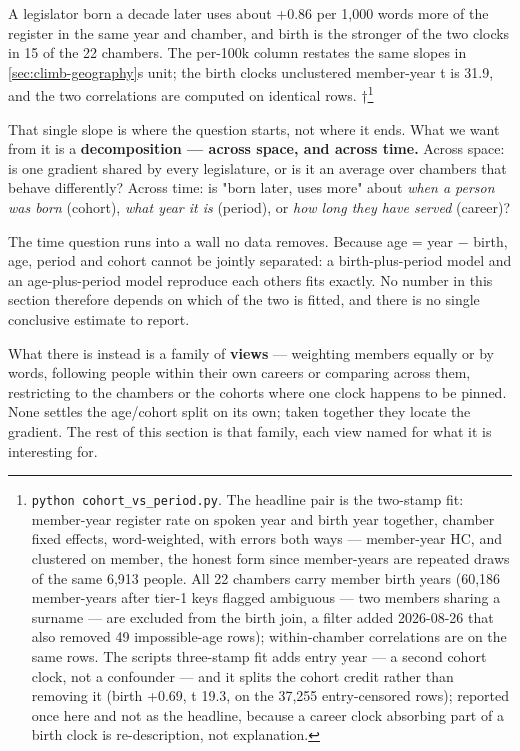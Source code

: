 A legislator born a decade later uses about +0.86 per 1,000 words more of the register in the same year and chamber, and birth is the stronger of the two clocks in 15 of the 22 chambers. The per-100k column restates the same slopes in \cref{sec:climb-geography}\textquotesingle s unit; the birth clock\textquotesingle s unclustered member-year t is 31.9, and the two correlations are computed on identical rows. †\footnote{\texttt{python\ cohort\_\allowbreak{}vs\_\allowbreak{}period.\allowbreak{}py}. The headline pair is the two-stamp fit: member-year register rate on spoken year and birth year together, chamber fixed effects, word-weighted, with errors both ways --- member-year HC, and clustered on member, the honest form since member-years are repeated draws of the same 6,913 people. All 22 chambers carry member birth years (60,186 member-years after tier-1 keys flagged ambiguous --- two members sharing a surname --- are excluded from the birth join, a filter added 2026-08-26 that also removed 49 impossible-age rows); within-chamber correlations are on the same rows. The script\textquotesingle s three-stamp fit adds entry year --- a second cohort clock, not a confounder --- and it splits the cohort credit rather than removing it (birth +0.69, t 19.3, on the 37,255 entry-censored rows); reported once here and not as the headline, because a career clock absorbing part of a birth clock is re-description, not explanation.}

That single slope is where the question starts, not where it ends. What we want from it is a \textbf{decomposition --- across space, and across time.} Across space: is one gradient shared by every legislature, or is it an average over chambers that behave differently? Across time: is "born later, uses more" about \emph{when a person was born} (cohort), \emph{what year it is} (period), or \emph{how long they have served} (career)?

The time question runs into a wall no data removes. Because age = year \(-\) birth, age, period and cohort cannot be jointly separated: a birth-plus-period model and an age-plus-period model reproduce each other\textquotesingle s fits exactly. No number in this section therefore depends on which of the two is fitted, and there is no single conclusive estimate to report.

What there is instead is a family of \textbf{views} --- weighting members equally or by words, following people within their own careers or comparing across them, restricting to the chambers or the cohorts where one clock happens to be pinned. None settles the age/cohort split on its own; taken together they locate the gradient. The rest of this section is that family, each view named for what it is interesting for.

